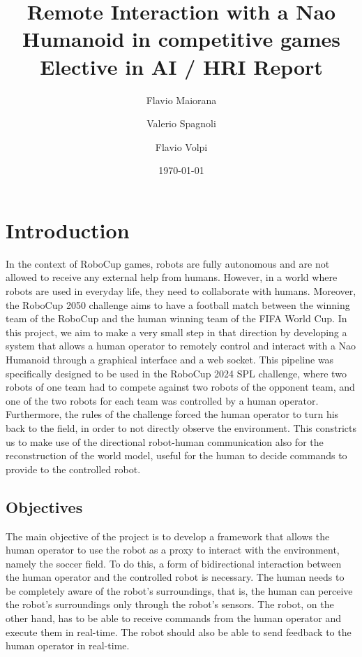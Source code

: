 \documentclass[a4paper, onecolumn, 12pt]{article}
\title{Remote Interaction with a Nao Humanoid in competitive games \\ Elective in AI / HRI Report}
\author{Flavio Maiorana \and Valerio Spagnoli \and Flavio Volpi}
\date{\today}
\begin{document}
\maketitle

\section{Introduction}
\label{sec:intro}

In the context of RoboCup games, robots are fully autonomous and are not allowed
to receive any external help from humans. However, in a world where robots are
used in everyday life, they need to collaborate with humans.
Moreover, the RoboCup 2050 challenge aims to have a football match between the
winning team of the RoboCup and the human winning team of the FIFA World Cup. In
this project, we aim to make a very small step in that direction by developing a
system that allows a human operator to remotely control and interact with a Nao
Humanoid through a graphical interface and a web socket. This pipeline was
specifically designed to be used in the RoboCup 2024 SPL challenge, where two robots
of one team had to compete against two robots of the opponent team, and one of the
two robots for each team was controlled by a human operator. Furthermore, the rules
of the challenge forced the human operator to turn his back to the field, in order
to not directly observe the environment. This constricts us to make use of the 
directional robot-human communication also for the reconstruction of the world model,
useful for the human to decide commands to provide to the controlled robot.


\subsection{Objectives}
\label{sec:obj}

The main objective of the project is to develop a framework that allows the human operator
to use the robot as a proxy to interact with the environment, namely the soccer
field. To do this, a form of bidirectional interaction between the human operator 
and the controlled robot is necessary. The human needs
to be completely aware of the robot's surroundings, that is, the human can
perceive the robot's surroundings only through the robot's sensors. The robot,
on the other hand, has to be able to receive commands from the human operator
and execute them in real-time. The robot should also be able to send feedback to
the human operator in real-time. 
\end{document}
